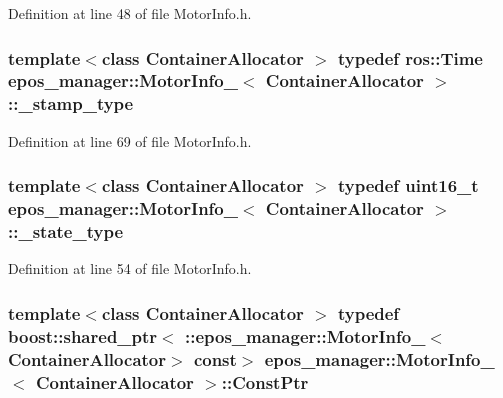 \-Definition at line 48 of file \-Motor\-Info.\-h.

\subsubsection[{\-\_\-stamp\-\_\-type}]{\setlength{\rightskip}{0pt plus 5cm}template$<$class Container\-Allocator $>$ typedef ros\-::\-Time {\bf epos\-\_\-manager\-::\-Motor\-Info\-\_\-}$<$ \-Container\-Allocator $>$\-::{\bf \-\_\-stamp\-\_\-type}}\label{structepos__manager_1_1MotorInfo___a353db97bf56ddeb0a3ad4d0d56544503}


\-Definition at line 69 of file \-Motor\-Info.\-h.

\subsubsection[{\-\_\-state\-\_\-type}]{\setlength{\rightskip}{0pt plus 5cm}template$<$class Container\-Allocator $>$ typedef uint16\-\_\-t {\bf epos\-\_\-manager\-::\-Motor\-Info\-\_\-}$<$ \-Container\-Allocator $>$\-::{\bf \-\_\-state\-\_\-type}}\label{structepos__manager_1_1MotorInfo___a8f62b87124919a6125d027fb583a1bc6}


\-Definition at line 54 of file \-Motor\-Info.\-h.

\subsubsection[{\-Const\-Ptr}]{\setlength{\rightskip}{0pt plus 5cm}template$<$class Container\-Allocator $>$ typedef boost\-::shared\-\_\-ptr$<$ \-::{\bf epos\-\_\-manager\-::\-Motor\-Info\-\_\-}$<$\-Container\-Allocator$>$ const$>$ {\bf epos\-\_\-manager\-::\-Motor\-Info\-\_\-}$<$ \-Container\-Allocator $>$\-::{\bf \-Const\-Ptr}}\label{structepos__manager_1_1MotorInfo___a11d462a544e4565b7a6c87f36247e2a7}


